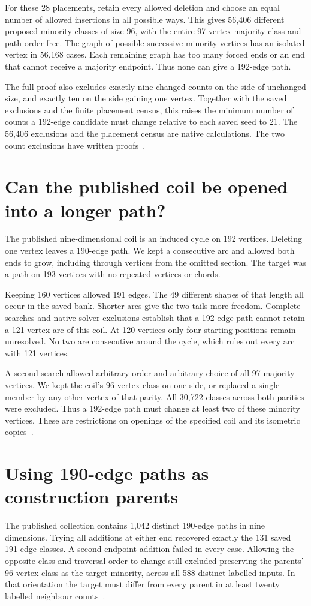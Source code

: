 \documentclass[11pt,a4paper]{article}
\begin{document}
For these 28 placements, retain every allowed deletion and choose an
equal number of allowed insertions in all possible ways. This gives
56,406 different proposed minority classes of size 96, with the entire
97-vertex majority class and path order free. The graph of possible
successive minority vertices has an isolated vertex in 56,168 cases.
Each remaining graph has too many forced ends or an end that cannot
receive a majority endpoint. Thus none can give a 192-edge path.

The full proof also excludes exactly nine changed counts on the side
of unchanged size, and exactly ten on the side gaining one vertex.
Together with the saved exclusions and the finite placement census,
this raises the minimum number of counts a 192-edge candidate must
change relative to each saved seed to 21. The 56,406 exclusions and
the placement census are native calculations. The two count exclusions
have written proofs~\cite{research242}.

\section{Can the published coil be opened into a longer path?}
The published nine-dimensional coil is an induced cycle on 192
vertices. Deleting one vertex leaves a 190-edge path. We kept a
consecutive arc and allowed both ends to grow, including through
vertices from the omitted section. The target was a path on
193 vertices with no repeated vertices or chords.

Keeping 160 vertices allowed 191 edges. The 49 different shapes
of that length all occur in the saved bank. Shorter arcs give
the two tails more freedom. Complete searches and native solver
exclusions establish that a 192-edge path cannot retain a
121-vertex arc of this coil. At 120 vertices only four starting
positions remain unresolved. No two are consecutive around the cycle,
which rules out every arc with 121 vertices.

A second search allowed arbitrary order and arbitrary choice of all
97 majority vertices. We kept the coil's 96-vertex class on one
side, or replaced a single member by any other vertex of that parity.
All 30,722 classes across both parities were excluded. Thus a
192-edge path must change at least two of these minority vertices.
These are restrictions on openings of the specified coil and its
isometric copies~\cite{coilopening243}.

\section{Using 190-edge paths as construction parents}
The published collection contains 1,042 distinct 190-edge paths in
nine dimensions. Trying all additions at either end recovered exactly
the 131 saved 191-edge classes. A second endpoint addition failed in
every case. Allowing the opposite class and traversal order to change
still excluded preserving the parents' 96-vertex class as the target
minority, across all 588 distinct labelled inputs. In that orientation
the target must differ from every parent in at least twenty labelled
neighbour counts~\cite{parents244}.
\end{document}
